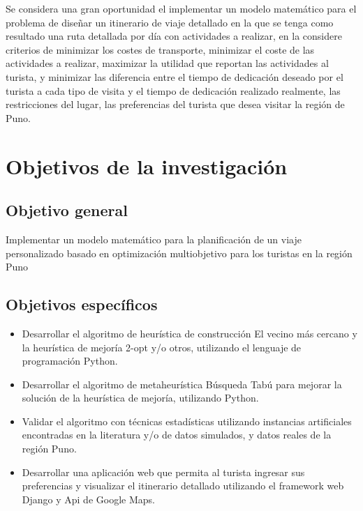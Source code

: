 Se considera una gran oportunidad el implementar un modelo matemático para el problema de diseñar un itinerario de viaje detallado en la que se tenga como resultado una ruta detallada por día con actividades a realizar, en la considere criterios de minimizar los costes de transporte, minimizar el coste de las actividades a realizar, maximizar la utilidad que reportan las actividades al turista, y minimizar las diferencia entre el tiempo de dedicación deseado por el turista a cada tipo de visita y el tiempo de dedicación realizado realmente, las restricciones del lugar, las preferencias del turista que desea visitar la región de Puno.

\section{Objetivos de la investigación}
\subsection{Objetivo general}
Implementar un modelo matemático para la planificación de un viaje personalizado basado en optimización multiobjetivo para los turistas en la región Puno
\subsection{Objetivos específicos}
\begin{itemize}[noitemsep]
\item Desarrollar el algoritmo de heurística de construcción El vecino más cercano y la heurística de mejoría 2-opt y/o otros, utilizando el lenguaje de programación Python.
\item Desarrollar el algoritmo de metaheurística Búsqueda Tabú para mejorar la solución de la heurística de mejoría, utilizando Python.
\item Validar el algoritmo con técnicas estadísticas utilizando instancias artificiales encontradas en la literatura y/o de datos simulados, y datos reales de la región Puno.
\item Desarrollar una aplicación web que permita al turista ingresar sus preferencias y visualizar el itinerario detallado utilizando el framework web Django y Api de Google Maps.
\end{itemize}
